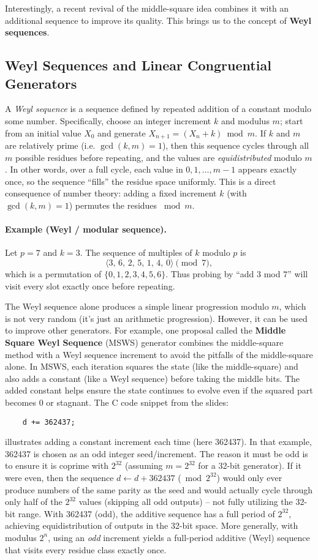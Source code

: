 \documentclass[11pt]{article}
\begin{document}
Interestingly, a recent revival of the middle-square idea combines it with an additional sequence to improve its quality. This brings us to the concept of \textbf{Weyl sequences}.

\subsection{Weyl Sequences and Linear Congruential Generators}
A \emph{Weyl sequence} is a sequence defined by repeated addition of a constant modulo some number. Specifically, choose an integer increment $k$ and modulus $m$; start from an initial value $X_0$ and generate $X_{n+1} = (X_n + k) \bmod m$. If $k$ and $m$ are relatively prime (i.e. $\gcd(k,m)=1$), then this sequence cycles through all $m$ possible residues before repeating, and the values are \emph{equidistributed} modulo $m$. In other words, over a full cycle, each value in $0,1,\ldots,m-1$ appears exactly once, so the sequence “fills” the residue space uniformly. This is a direct consequence of number theory: adding a fixed increment $k$ (with $\gcd(k,m)=1$) permutes the residues $ \bmod m$.

\paragraph{Example (Weyl / modular sequence).}
Let \(p=7\) and \(k=3\). The sequence of multiples of \(k\) modulo \(p\) is
\[
\langle 3,\,6,\,2,\,5,\,1,\,4,\,0\rangle \pmod{7},
\]
which is a permutation of \(\{0,1,2,3,4,5,6\}\). Thus probing by “add \(3\) mod \(7\)” will visit every slot exactly once before repeating.

The Weyl sequence alone produces a simple linear progression modulo $m$, which is not very random (it’s just an arithmetic progression). However, it can be used to improve other generators. For example, one proposal called the \textbf{Middle Square Weyl Sequence} (MSWS) generator combines the middle-square method with a Weyl sequence increment to avoid the pitfalls of the middle-square alone. In MSWS, each iteration squares the state (like the middle-square) and also adds a constant (like a Weyl sequence) before taking the middle bits. The added constant helps ensure the state continues to evolve even if the squared part becomes 0 or stagnant. The C code snippet from the slides:
\begin{verbatim}
    d += 362437;
\end{verbatim}
illustrates adding a constant increment each time (here 362437). In that example, 362437 is chosen as an odd integer seed/increment. The reason it must be odd is to ensure it is coprime with $2^{32}$ (assuming $m=2^{32}$ for a 32-bit generator). If it were even, then the sequence $d \leftarrow d + 362437$ ($ \bmod 2^{32}$) would only ever produce numbers of the same parity as the seed and would actually cycle through only half of the $2^{32}$ values (skipping all odd outputs) – not fully utilizing the 32-bit range. With 362437 (odd), the additive sequence has a full period of $2^{32}$, achieving equidistribution of outputs in the 32-bit space. More generally, with modulus $2^n$, using an \emph{odd} increment yields a full-period additive (Weyl) sequence that visits every residue class exactly once.
\end{document}
